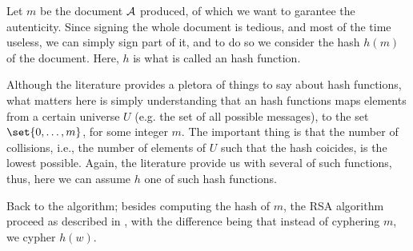 \documentclass{subfiles}
\begin{document}
    Let \(m\) be the document \(\operatorname{\mathcal{A}}\) produced, 
        of which we want to garantee the autenticity.
        Since signing the whole document is tedious, and most of the time useless,
        we can simply sign part of it, and to do so we consider the hash \(h(m)\) of the document.
        Here, \(h\) is what is called an hash function.

    Although the literature provides a pletora of things to say about hash functions,
        what matters here is simply understanding that an hash functions 
        maps elements from a certain universe \(U\) (e.g. the set of all possible messages),
        to the set \(\set{0, \ldots, m}\), for some integer \(m\).
        The important thing is that the number of collisions, i.e.,
        the number of elements of \(U\) such that the hash coicides,
        is the lowest possible. Again, the literature provide us with several of such functions,
        thus, here we can assume \(h\) one of such hash functions.

    Back to the algorithm; besides computing the hash of \(m\),
        the RSA algorithm proceed as described in ,
        with the difference being that instead of cyphering \(m\), 
        we cypher \(h(w)\).
\end{document}
